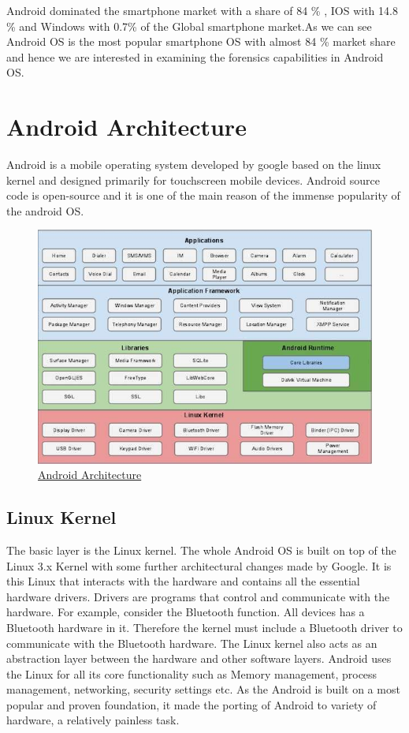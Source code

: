 Android dominated the smartphone market with a share of 84 \% , IOS with 14.8 \% and Windows with 0.7\% of the Global smartphone market.As we can see Android OS is the most popular smartphone OS with almost 84 \% market share and hence we  are interested in examining the forensics capabilities in Android OS. 
\goodbreak
\section{Android Architecture}
Android is a mobile operating system developed by google based on the linux kernel and designed primarily for touchscreen mobile devices. Android source code is open-source and it is one of the main reason of the immense popularity of the android OS.
\begin{figure}
   \vspace*{-1cm}
    \includegraphics[height=0.5\textheight]{Figures/fig01/architecture}
    \caption{\href{https://www.tutorialspoint.com/android/}{Android Architecture} }
    
   
    
  \end{figure}


\subsection{Linux Kernel}
The basic layer is the Linux kernel. The whole Android OS is built on top of the Linux 3.x Kernel with some further architectural changes made by Google. It is this Linux that interacts with the hardware and contains all the essential hardware drivers. Drivers are programs that control and communicate with the hardware. For example, consider the Bluetooth function. All devices has a Bluetooth hardware in it. Therefore the kernel must include a Bluetooth driver to communicate with the Bluetooth hardware. The Linux kernel also acts as an abstraction layer between the hardware and other software layers. Android uses the Linux for all its core functionality such as Memory management, process management, networking, security settings etc. As the Android is built on a most popular and proven foundation, it made the porting of Android to variety of hardware, a relatively painless task.



